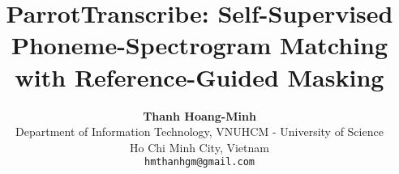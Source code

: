 \documentclass[10pt,twocolumn,letterpaper]{article}
\title{ParrotTranscribe: Self-Supervised Phoneme-Spectrogram Matching with Reference-Guided Masking}
\author{\textbf{Thanh Hoang-Minh \orcidlink{0009-0007-0898-5923}}\\
Department of Information Technology, VNUHCM - University of Science\\
Ho Chi Minh City, Vietnam \\
{\tt\small hmthanhgm@gmail.com}
}
\begin{document}
\maketitle
    







{
    \small
    
    
}


% 
\end{document}
